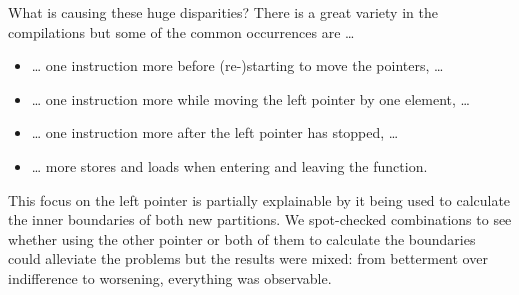 What is causing these huge disparities?
There is a great variety in the compilations but some of the common occurrences are \dots{}
\begin{itemize}
	\item
	\dots{} one instruction more before (re-)starting to move the pointers, \dots{}

	\item
	\dots{} one instruction more while moving the left pointer by one element, \dots{}

	\item
	\dots{} one instruction more after the left pointer has stopped, \dots{}

	\item
	\dots{} more stores and loads when entering and leaving the function.
\end{itemize}
This focus on the left pointer is partially explainable by it being used to calculate the inner boundaries of both new partitions.
We spot-checked combinations to see whether using the other pointer or both of them to calculate the boundaries could alleviate the problems but the results were mixed:
from betterment over indifference to worsening, everything was observable.
